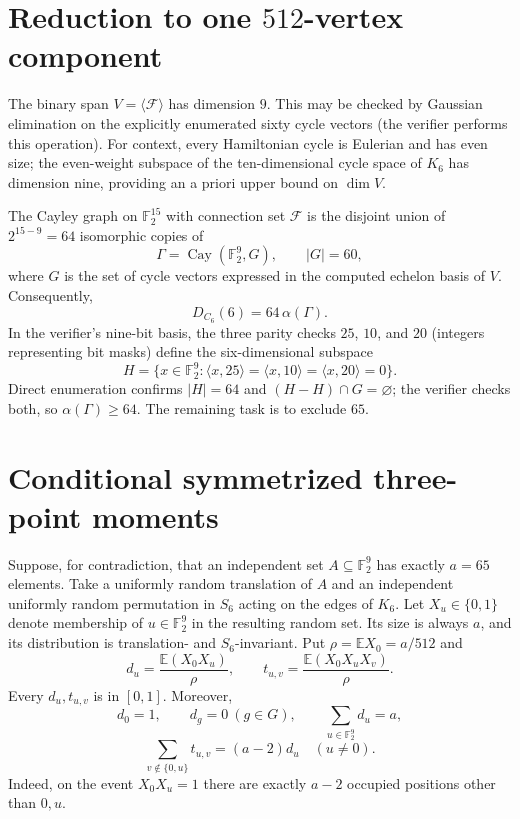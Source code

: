 \documentclass[11pt,a4paper]{article}
\newcommand{\F}{\mathbb F}
\newcommand{\calF}{\mathcal F}
\begin{document}
\section{Reduction to one $512$-vertex component}
The binary span $V=\langle\calF\rangle$ has dimension $9$. This may be checked by Gaussian elimination on the explicitly enumerated sixty cycle vectors (the verifier performs this operation). For context, every Hamiltonian cycle is Eulerian and has even size; the even-weight subspace of the ten-dimensional cycle space of $K_6$ has dimension nine, providing an a priori upper bound on $\dim V$.

The Cayley graph on $\F_2^{15}$ with connection set $\calF$ is the disjoint union of $2^{15-9}=64$ isomorphic copies of
\[
\Gamma=\operatorname{Cay}(\F_2^9,G), \qquad |G|=60,
\]
where $G$ is the set of cycle vectors expressed in the computed echelon basis of $V$. Consequently,
\begin{equation}\label{eq:factor}
D_{C_6}(6)=64\,\alpha(\Gamma).
\end{equation}
In the verifier's nine-bit basis, the three parity checks $25$, $10$, and $20$ (integers representing bit masks) define the six-dimensional subspace
\[
H=\{x\in\F_2^9:\langle x,25\rangle=\langle x,10\rangle=
\langle x,20\rangle=0\}.
\]
Direct enumeration confirms $|H|=64$ and $(H-H)\cap G=\varnothing$; the verifier checks both, so $\alpha(\Gamma)\ge64$. The remaining task is to exclude $65$.

\section{Conditional symmetrized three-point moments}\label{sec:moments}
Suppose, for contradiction, that an independent set $A\subseteq\F_2^9$ has exactly $a=65$ elements. Take a uniformly random translation of $A$ and an independent uniformly random permutation in $S_6$ acting on the edges of $K_6$. Let $X_u\in\{0,1\}$ denote membership of $u\in\F_2^9$ in the resulting random set. Its size is always $a$, and its distribution is translation- and $S_6$-invariant. Put $\rho=\mathbb E X_0=a/512$ and
\[
d_u=\frac{\mathbb E(X_0X_u)}{\rho},\qquad
 t_{u,v}=\frac{\mathbb E(X_0X_uX_v)}{\rho}.
\]
Every $d_u,t_{u,v}$ is in $[0,1]$. Moreover,
\begin{equation}\label{eq:elementary}
d_0=1,\qquad d_g=0\ (g\in G),\qquad
 \sum_{u\in\F_2^9}d_u=a,
\end{equation}
\begin{equation}\label{eq:extension}
\sum_{v\notin\{0,u\}}t_{u,v}=(a-2)d_u\quad (u\ne0).
\end{equation}
Indeed, on the event $X_0X_u=1$ there are exactly $a-2$ occupied positions other than $0,u$.
\end{document}
